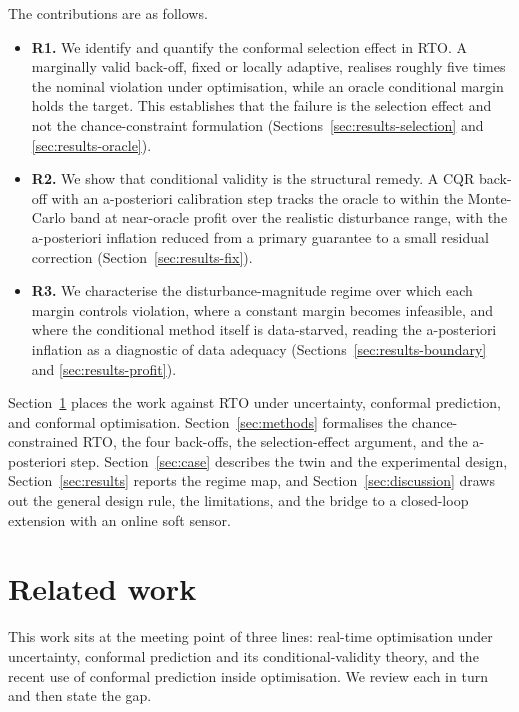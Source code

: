 \documentclass[review,times]{elsarticle}
\begin{document}
The contributions are as follows.
\begin{itemize}
\item \textbf{R1.} We identify and quantify the conformal selection effect in RTO. A
  marginally valid back-off, fixed or locally adaptive, realises roughly five times the
  nominal violation under optimisation, while an oracle conditional margin holds the target.
  This establishes that the failure is the selection effect and not the chance-constraint
  formulation (Sections~\ref{sec:results-selection} and \ref{sec:results-oracle}).
\item \textbf{R2.} We show that conditional validity is the structural remedy. A CQR
  back-off with an a-posteriori calibration step tracks the oracle to within the
  Monte-Carlo band at near-oracle profit over the realistic disturbance range, with the
  a-posteriori inflation reduced from a primary guarantee to a small residual correction
  (Section~\ref{sec:results-fix}).
\item \textbf{R3.} We characterise the disturbance-magnitude regime over which each margin
  controls violation, where a constant margin becomes infeasible, and where the conditional
  method itself is data-starved, reading the a-posteriori inflation as a diagnostic of data
  adequacy (Sections~\ref{sec:results-boundary} and \ref{sec:results-profit}).
\end{itemize}

Section~\ref{sec:related} places the work against RTO under uncertainty, conformal
prediction, and conformal optimisation. Section~\ref{sec:methods} formalises the
chance-constrained RTO, the four back-offs, the selection-effect argument, and the
a-posteriori step. Section~\ref{sec:case} describes the twin and the experimental design,
Section~\ref{sec:results} reports the regime map, and Section~\ref{sec:discussion} draws out
the general design rule, the limitations, and the bridge to a closed-loop extension with an
online soft sensor.

\section{Related work}
\label{sec:related}

This work sits at the meeting point of three lines: real-time optimisation under
uncertainty, conformal prediction and its conditional-validity theory, and the recent use
of conformal prediction inside optimisation. We review each in turn and then state the gap.
\end{document}
